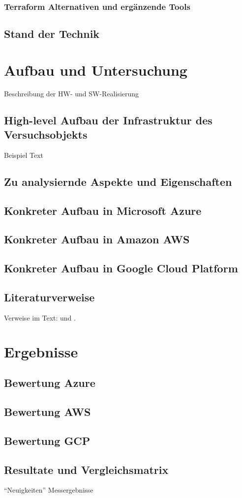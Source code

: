 \subsection{Terraform Alternativen und ergänzende Tools}

\section{Stand der Technik}

\chapter{Aufbau und Untersuchung}
\label{sec:real}
Beschreibung der HW- und SW-Realisierung

\section{High-level Aufbau der Infrastruktur des Versuchsobjekts}
\label{sec:real-unter}
Beispiel Text

\section{Zu analysiernde Aspekte und Eigenschaften}

\section{Konkreter Aufbau in Microsoft Azure}

\section{Konkreter Aufbau in Amazon AWS}

\section{Konkreter Aufbau in Google Cloud Platform}

\section{Literaturverweise}
\label{sec:real-literatur}

Verweise im Text: \cite{doc:stz} und \cite{doc:gun}.

\chapter{Ergebnisse}
\label{sec:ergeb}

\section{Bewertung Azure}

\section{Bewertung AWS}

\section{Bewertung GCP}

\section{Resultate und Vergleichsmatrix}

\enquote{Neuigkeiten} Messergebnisse
